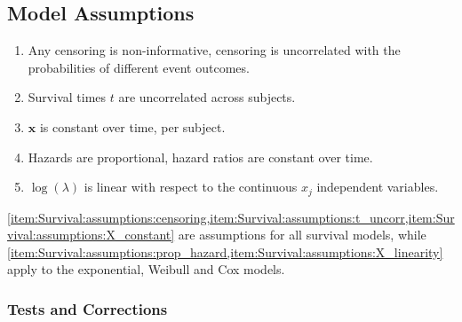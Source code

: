 \subsection{Model Assumptions}
\label{additional:Survival:assumptions}

\begin{enumerate}[noitemsep]
\item Any censoring is non-informative, \ie censoring is uncorrelated with the probabilities of different event outcomes.\label{item:Survival:assumptions:censoring}
\item Survival times $t$ are uncorrelated across subjects.\label{item:Survival:assumptions:t_uncorr}
\item $\mathbf{x}$ is constant over time, per subject.\label{item:Survival:assumptions:X_constant}
\item Hazards are proportional, \ie hazard ratios are constant over time.\label{item:Survival:assumptions:prop_hazard}
\item $\log\left(\lambda\right)$ is linear with respect to the continuous $x_{j}$ independent variables.\label{item:Survival:assumptions:X_linearity}
\end{enumerate}

\cref{item:Survival:assumptions:censoring,item:Survival:assumptions:t_uncorr,item:Survival:assumptions:X_constant}
are assumptions for all survival models, while
\cref{item:Survival:assumptions:prop_hazard,item:Survival:assumptions:X_linearity}
apply to the exponential, Weibull and Cox models.

\subsubsection{Tests and Corrections}
\label{additional:Survival:assumptions:tests_and_corrections}

